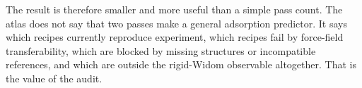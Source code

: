 The result is therefore smaller and more useful than a simple pass count. The atlas does not say that two passes make a general adsorption predictor. It says which recipes currently reproduce experiment, which recipes fail by force-field transferability, which are blocked by missing structures or incompatible references, and which are outside the rigid-Widom observable altogether. That is the value of the audit.

\FloatBarrier
